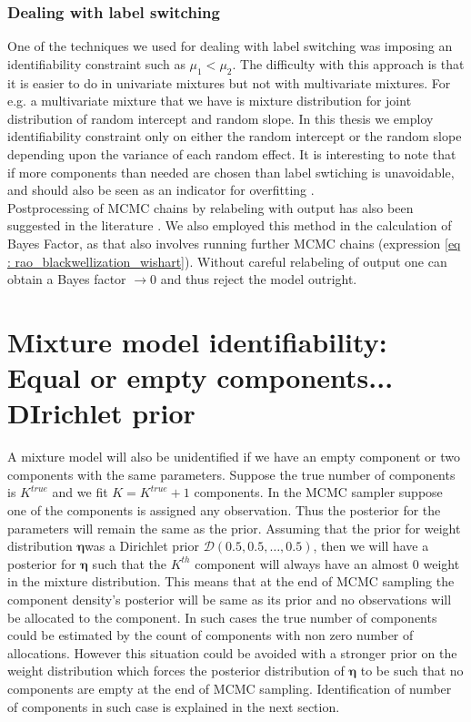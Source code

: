 \subsubsection{Dealing with label switching}
One of the techniques we used for dealing with label switching was imposing an identifiability constraint such as $\mu_1 < \mu_2$. The difficulty with this approach is that it is easier to do in univariate mixtures but not with multivariate mixtures. For e.g. a multivariate mixture that we have is mixture distribution for joint distribution of random intercept and random slope. In this thesis we employ identifiability constraint only on either the random intercept or the random slope depending upon the variance of each random effect. It is interesting to note that if more components than needed are chosen than label swtiching is unavoidable, and should also be seen as an indicator for overfitting \citep[pg. 104]{fruhwirth-schnatter_finite_2013}.\\

Postprocessing of MCMC chains by relabeling with output has also been suggested in the literature \citep{richardson_bayesian_1997,stephens_dealing_2000}. We also employed this method in the calculation of Bayes Factor, as that also involves running further MCMC chains (expression \ref{eq : rao_blackwellization_wishart}). Without careful relabeling of output one can obtain a Bayes factor $\to 0$ and thus reject the model outright.

\section{Mixture model identifiability: Equal or empty components... DIrichlet prior}
A mixture model will also be unidentified if we have an empty component or two components with the same parameters. Suppose the true number of components is $K^{true}$ and we fit $K = K^{true} + 1$ components. In the MCMC sampler suppose one of the components is assigned any observation. Thus the posterior for the parameters will remain the same as the prior. Assuming that the prior for weight distribution $\boldsymbol{\eta}$was a Dirichlet prior $\mathcal{D}(0.5, 0.5, \ldots, 0.5)$, then we will have a posterior for $\boldsymbol{\eta}$ such that the $K^{th}$ component will always have an almost 0 weight in the mixture distribution. This means that at the end of MCMC sampling the component density's posterior will be same as its prior and no observations will be allocated to the component. In such cases the true number of components could be estimated by the count of components with non zero number of allocations. However this situation could be avoided with a stronger prior on the weight distribution which forces the posterior distribution of $\boldsymbol{\eta}$ to be such that no components are empty at the end of MCMC sampling. Identification of number of components in such case is explained in the next section.\\